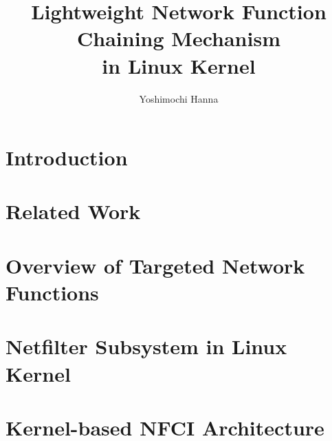 \documentclass[12pt]{b-thesis}
\begin{document}
\title{Lightweight Network Function Chaining Mechanism \\ in Linux Kernel}
\subteacher{ }
\author{Yoshimochi Hanna}
\maketitle

 
\makejabstract 

\clearpage


\setcounter{page}{1}

\tableofcontents
\thispagestyle{plain}

\listoffigures   %
\listoftables    %

\clearpage

\pagestyle{headings}
\setcounter{page}{1}

\clearpage

\chapter{Introduction}
\label{chap:intro}


\chapter{Related Work}
\label{chap:related}


\chapter{Overview of Targeted Network Functions}
\label{chap:overview}


\chapter{Netfilter Subsystem in Linux Kernel}
\label{chap:linux}


\chapter{Kernel-based NFCI Architecture}
\label{chap:architecture}

\end{document}
